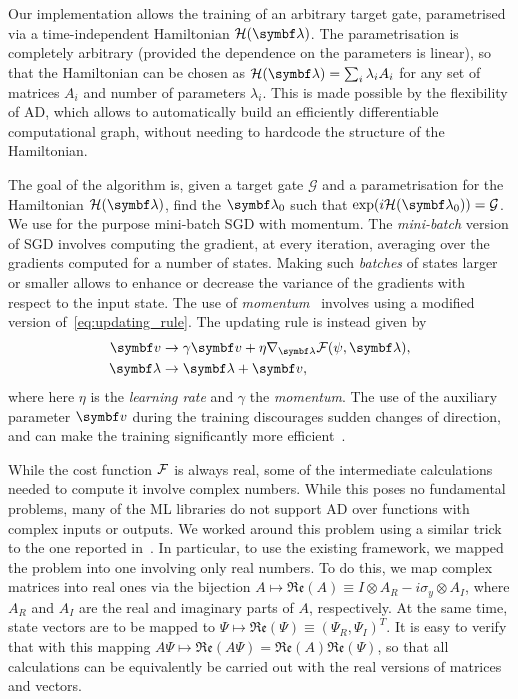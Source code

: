 Our implementation allows the training of an arbitrary target gate, parametrised via a time-independent Hamiltonian $\mathcal H(\bs\lambda)$.
The parametrisation is completely arbitrary (provided the dependence on the parameters is linear), so that the Hamiltonian can be chosen as $\mathcal H(\bs\lambda)=\sum_i \lambda_i A_i$ for any set of matrices $A_i$ and number of parameters $\lambda_i$.
This is made possible by the flexibility of \ac{AD}, which allows to automatically build an efficiently differentiable computational graph, without needing to hardcode the structure of the Hamiltonian.

The goal of the algorithm is, given a target gate $\mathcal G$ and a parametrisation for the Hamiltonian $\mathcal H(\bs\lambda)$, find the $\bs\lambda_0$ such that $\exp(i\mathcal H(\bs\lambda_0))=\mathcal G$.
We use for the purpose mini-batch \ac{SGD} with momentum.
The \emph{mini-batch} version of \ac{SGD} involves computing the gradient, at every iteration, averaging over the gradients computed for a number of states.
Making such \emph{batches} of states larger or smaller allows to enhance or decrease the variance of the gradients with respect to the input state.
The use of \emph{momentum}~\cite{ruder2016overview,goh2017momentum} involves using a modified version of~\cref{eq:updating_rule}.
The updating rule is instead given by
\begin{equation}
\begin{aligned}
	\bs v &\to \gamma \bs v + \eta \grad_{\bs\lambda} \calF(\psi, \bs\lambda), \\
	\bs\lambda &\to \bs\lambda + \bs v,
\end{aligned}
\label{eq:updating_rule_momentum}
\end{equation}
where here $\eta$ is the \emph{learning rate} and $\gamma$ the \emph{momentum}.
The use of the auxiliary parameter $\bs v$ during the training discourages sudden changes of direction, and can make the training significantly more efficient~\cite{goh2017momentum}.

While the cost function ${\mathcal{F}}$ is always real, some of the intermediate calculations needed to compute it involve complex numbers.
While this poses no fundamental problems, many of the \ac{ML} libraries do not support \ac{AD} over functions with complex inputs or outputs.
We worked around this problem using a similar trick to the one reported in~\cite{leung2017speedup}.
In particular, to use the existing framework, we mapped the problem into one involving only real numbers.
To do this, we map complex matrices into real ones via the bijection
$A\mapsto\mathfrak{Re}(A)\equiv I \otimes A_{R} - i \sigma_y\otimes A_{I}$,
where $A_R$ and $A_I$ are the real and imaginary parts of $A$, respectively.
At the same time, state vectors are to be mapped to
$\Psi\mapsto\mathfrak{Re}(\Psi)\equiv(\Psi_R, \Psi_I)^T$.
It is easy to verify that with this mapping
$A\Psi\mapsto\mathfrak{Re}(A\Psi)=\mathfrak{Re}(A)\mathfrak{Re}(\Psi)$,
so that all calculations can be equivalently be carried out with the real versions of matrices and vectors.


